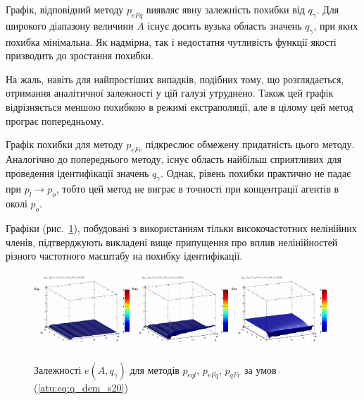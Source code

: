 Графік, відповідний методу $p_{eFq}$ виявляє явну залежність похибки від
$q_\gamma$. Для широкого діапазону величини $ A $ існує досить вузька область
значень $q_\gamma$, при яких похибка мінімальна. Як надмірна, так і
недостатня чутливість функції якості призводить до зростання похибки.

На жаль, навіть для найпростіших випадків, подібних тому, що розглядається,
отримання аналітичної залежності у цій галузі утруднено. Також
цей графік відрізняється меншою похибкою в режимі
екстраполяції, але в цілому цей метод програє попередньому.

Графік похибки для методу $p_{eFc}$ підкреслює обмежену придатність цього методу.
Аналогічно до попереднього методу, існує область найбільш
сприятливих для проведення ідентифікації значень
$q_\gamma$. Однак, рівень похибки практично не падає при
$p_l \to p_o$, тобто цей метод не виграє в точності при концентрації
агентів в околі
$p_o$.

Графіки (рис.~\ref{atu:f:qsl_pe_A_qg_s20}), побудовані з використанням тільки
високочастотних нелінійних членів, підтверджують викладені
вище припущення про вплив нелінійностей різного частотного
масштабу на похибку ідентифікації.

\begin{figure}[htb!]
  \begin{center}
    \includegraphics[width=0.32\textwidth]{p/qls_pe-p_A_qg_eql_s20.png}
    \hfill
    \includegraphics[width=0.32\textwidth]{p/qls_pe-p_A_qg_eFq_s20.png}
    \hfill
    \includegraphics[width=0.32\textwidth]{p/qls_pe-p_A_qg_eFc_s20.png}
  \end{center}
  \caption{Залежності $e(A,q_\gamma)$ для методів $p_{eql}$, $p_{eFq}$, $p_{qFc}$ за умов (\ref{atu:eq:q_dem_s20})}
  \label{atu:f:qsl_pe_A_qg_s20}
\end{figure}

